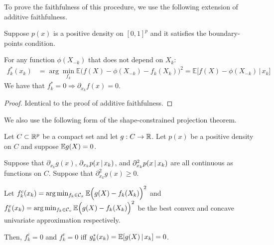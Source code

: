 \documentclass{article}
\begin{document}
To prove the faithfulness of this procedure, we use the following extension of additive faithfulness.

\begin{corollary} 
\label{cor:faithfulness_extension}
Suppose $p(x)$ is a positive density on $[0,1]^p$ and it satisfies the boundary-points condition.

For any function $\phi(X_{-k})$ that does not depend on $X_k$:
 \begin{align*}
f^*_k(x_k) &= \arg\min_{f_k} \mathbb{E} \Big( f(X) 
           - \phi(X_{-k}) - f_k(X_k) \Big)^2 
      = \mathbb{E}\Big[ f(X) - \phi(X_{-k}) \,|\, x_k\Big] 
\end{align*}
We have that $ f^*_k = 0 \Rightarrow \partial_{x_k} f(x) = 0$.
\end{corollary}

\begin{proof}
Identical to the proof of additive faithfulness.
\end{proof}

We also use the following form of the shape-constrained projection theorem.

\begin{proposition}
\label{prop:shape_approx_univariate}
Let $C \subset \mathbb{R}^p$ be a compact set and let $g : C \rightarrow \mathbb{R}$. Let $p(x)$ be a positive density on $C$ and suppose $\mathbb{E} g(X) = 0$.


Suppose that $\partial_{x_k} g(x)$, $\partial_{x_k} p( x \,|\, x_k)$, and $\partial^2_{x_k} p( x \,|\, x_k )$ are all continuous as functions on $C$. Suppose that $\partial^2_{x_k} g(x) \geq 0$.


Let $f^c_k(x_k) = \arg\min_{f_k \in \mathcal{C}_x} \mathbb{E} \Big( g(X) - f_k(X_k) \Big)^2$ and 
$f^v_k(x_k) = \arg\min_{f_k \in \mathcal{C}_v} \mathbb{E} \Big( g(X) - f_k(X_k) \Big)^2$ be the best convex and concave univariate approximation respectively.

Then, $f^c_k = 0$ and $f^v_k = 0$ iff $g^*_k(x_k) = \mathbb{E}[ g(X) \,|\, x_k ] = 0$.
\end{proposition}
\end{document}
